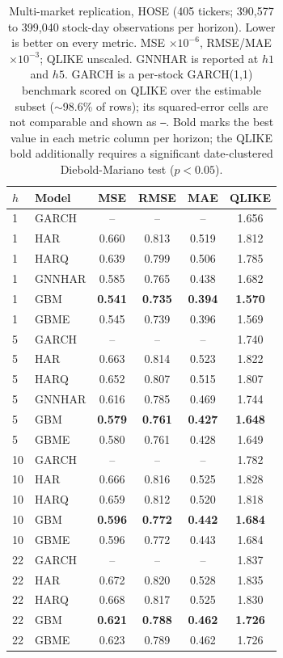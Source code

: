 \documentclass{llncs}
\begin{document}
\begin{table}[t]
\centering
\caption{Multi-market replication, HOSE (405 tickers; 390{,}577 to 399{,}040 stock-day observations per
horizon). Lower is better on every metric. MSE $\times10^{-6}$, RMSE/MAE $\times10^{-3}$; QLIKE
unscaled. GNNHAR is reported at $h1$ and $h5$. GARCH is a
per-stock GARCH(1,1) benchmark scored on QLIKE over the estimable subset ($\sim$98.6\% of rows); its
squared-error cells are not comparable and shown as \texttt{--}. Bold
marks the best value in each metric column per horizon; the QLIKE bold additionally requires a
significant date-clustered Diebold-Mariano test ($p<0.05$).}
\label{tab:hose}
\footnotesize
\setlength{\tabcolsep}{6pt}
\begin{tabular}{llcccc}
\toprule
$h$ & Model & MSE & RMSE & MAE & QLIKE \\
\midrule
1 & GARCH       & -- & -- & -- & 1.656 \\
1 & HAR         & 0.660 & 0.813 & 0.519 & 1.812 \\
1 & HARQ        & 0.639 & 0.799 & 0.506 & 1.785 \\
1 & GNNHAR      & 0.585 & 0.765 & 0.438 & 1.682 \\
1 & GBM         & \textbf{0.541} & \textbf{0.735} & \textbf{0.394} & \textbf{1.570} \\
1 & GBME        & 0.545 & 0.739 & 0.396 & 1.569 \\
\midrule
5 & GARCH       & -- & -- & -- & 1.740 \\
5 & HAR         & 0.663 & 0.814 & 0.523 & 1.822 \\
5 & HARQ        & 0.652 & 0.807 & 0.515 & 1.807 \\
5 & GNNHAR      & 0.616 & 0.785 & 0.469 & 1.744 \\
5 & GBM         & \textbf{0.579} & \textbf{0.761} & \textbf{0.427} & \textbf{1.648} \\
5 & GBME        & 0.580 & 0.761 & 0.428 & 1.649 \\
\midrule
10 & GARCH       & -- & -- & -- & 1.782 \\
10 & HAR         & 0.666 & 0.816 & 0.525 & 1.828 \\
10 & HARQ        & 0.659 & 0.812 & 0.520 & 1.818 \\
10 & GBM         & \textbf{0.596} & \textbf{0.772} & \textbf{0.442} & \textbf{1.684} \\
10 & GBME        & 0.596 & 0.772 & 0.443 & 1.684 \\
\midrule
22 & GARCH       & -- & -- & -- & 1.837 \\
22 & HAR         & 0.672 & 0.820 & 0.528 & 1.835 \\
22 & HARQ        & 0.668 & 0.817 & 0.525 & 1.830 \\
22 & GBM         & \textbf{0.621} & \textbf{0.788} & \textbf{0.462} & \textbf{1.726} \\
22 & GBME        & 0.623 & 0.789 & 0.462 & 1.726 \\
\bottomrule
\end{tabular}
\end{table}
\end{document}
